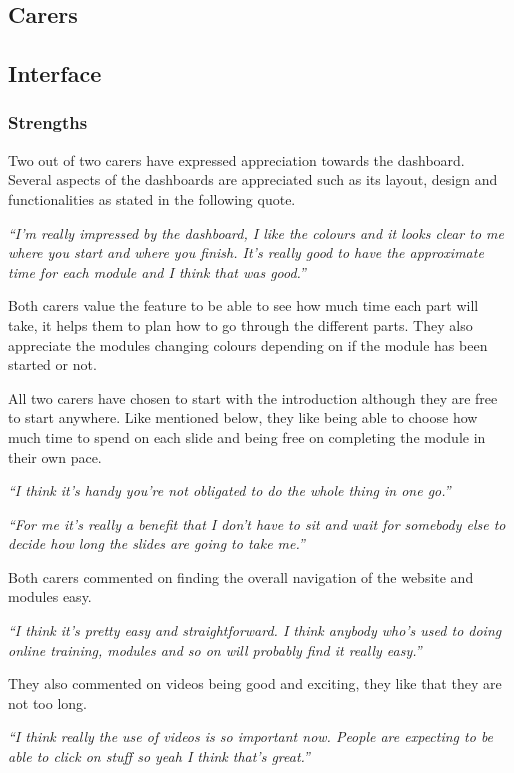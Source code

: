 \documentclass{sigchi}
\begin{document}
\subsection{Carers}

\subsection{Interface}
\subsubsection{Strengths}
Two out of two carers have expressed appreciation towards the dashboard. Several aspects of the dashboards are appreciated such as its layout, design and functionalities as stated in the following quote.  

\textit{“I’m really impressed by the dashboard, I like the colours and it looks clear to me where you start and where you finish. It’s really good to have the approximate time for each module and I think that was good.”}

Both carers value the feature to be able to see how much time each part will take, it helps them to plan how to go through the different parts. They also appreciate the modules changing colours depending on if the module has been started or not.

All two carers have chosen to start with the introduction although they are free to start anywhere. Like mentioned below, they like being able to choose how much time to spend on each slide and being free on completing the module in their own pace. 

\textit{“I think it’s handy you’re not obligated to do the whole thing in one go.”} 

\textit{“For me it’s really a benefit that I don't have to sit and wait for somebody else to decide how long the slides are going to take me.”}

Both carers commented on finding the overall navigation of the website and modules easy.

\textit{“I think it’s pretty easy and straightforward. I think anybody who’s used to doing online training, modules and so on will probably find it really easy.”}

They also commented on videos being good and exciting, they like that they are not too long. 

\textit{“I think really the use of videos is so important now. People are expecting to be able to click on stuff so yeah I think that’s great.”}
\end{document}
